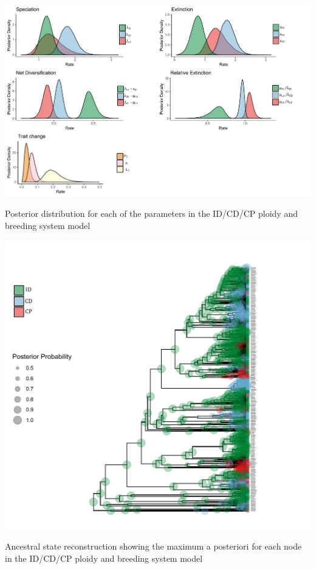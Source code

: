 \begin{suppfigure}
\includegraphics[width=\textwidth]{musseDPSInodipposteriordist.pdf}
\caption{Posterior distribution for each of the parameters in the ID/CD/CP ploidy and breeding system model} %
\label{suppfigure:IDCDCPnodip}
\end{suppfigure}

\begin{suppfigure}
\includegraphics[width=\textwidth]{asrIDCDCP.pdf}
\caption{Ancestral state reconstruction showing the maximum a posteriori for each node in the ID/CD/CP ploidy and breeding system model} %
\label{suppfigure:IDCDCPnodipasr}
\end{suppfigure}

